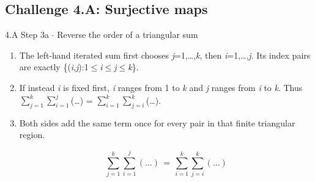 \documentclass[11pt]{article}
\begin{document}
\begin{keepsection}\subsection{Challenge 4.A: Surjective maps}

\begin{workedbox}{4.A Step 3a \ensuremath{\cdot} Reverse the order of a triangular sum}
\begin{enumerate}
\item The left-hand iterated sum first chooses \textit{j}=1,…,\textit{k}, then \textit{i}=1,…,\textit{j}. Its index pairs are exactly \{(\textit{i},\textit{j}):1\ensuremath{\leq}\textit{i}\ensuremath{\leq}\textit{j}\ensuremath{\leq}\textit{k}\}.
\item If instead \textit{i} is fixed first, \textit{i} ranges from 1 to \textit{k} and \textit{j} ranges from \textit{i} to \textit{k}. Thus $\sum_{{j}=1}^{{k}} $$\sum_{{i}=1}^{{j}} $(…) = $\sum_{{i}=1}^{{k}} $$\sum_{{j}={i}}^{{k}} $(…).
\item {}
Both sides add the same term once for every pair in that finite triangular region.

\begin{equation*}\sum_{{j}=1}^{{k}} \sum_{{i}=1}^{{j}} (…)\, =\, \sum_{{i}=1}^{{k}} \sum_{{j}={i}}^{{k}} (…)\end{equation*}
\end{enumerate}
\end{workedbox}

\end{keepsection}
\end{document}
